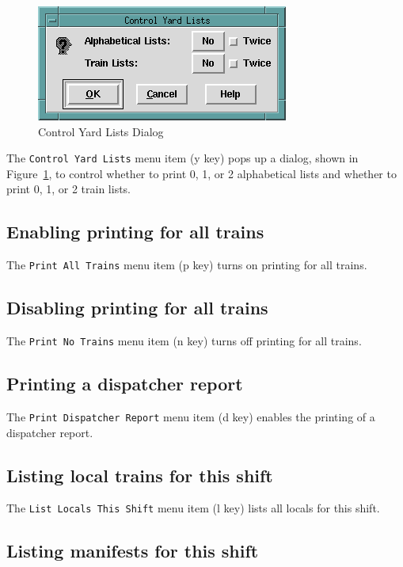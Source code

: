 \begin{figure}[hbpt]
\begin{centering}
\includegraphics{FCFControlYardLDialog.png}
\caption{Control Yard Lists Dialog}
\label{fig:fcf:controlyardldialog}
\end{centering}
\end{figure}
The \verb=Control Yard Lists= menu item (y key) pops up a dialog, shown
in Figure~\ref{fig:fcf:controlyardldialog}, to control whether to print
0, 1, or 2 alphabetical lists and whether to print 0, 1, or 2 train
lists.

\subsection{Enabling printing for all trains}

The \verb=Print All Trains= menu item (p key) turns on printing for all
trains. 

\subsection{Disabling printing for all trains}

The \verb=Print No Trains= menu item (n key) turns off printing for all
trains.

\subsection{Printing a dispatcher report}

The \verb=Print Dispatcher Report= menu item (d key) enables the
printing of a dispatcher report.

\subsection{Listing local trains for this shift}

The \verb=List Locals This Shift= menu item (l key) lists all locals for
this shift.

\subsection{Listing manifests for this shift}

